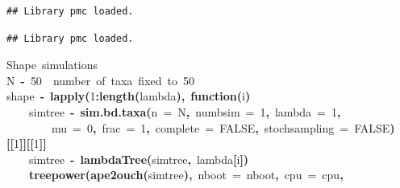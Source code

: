 \documentclass{elsarticle}
\makeatletter
\newcommand{\hlnumber}[1]{\textcolor[rgb]{0,0,0}{#1}}%
\newcommand{\hlfunctioncall}[1]{\textcolor[rgb]{.5,0,.33}{\textbf{#1}}}%
\newcommand{\hlkeyword}[1]{\textbf{#1}}%
\newcommand{\hlargument}[1]{\textcolor[rgb]{.69,.25,.02}{#1}}%
\newcommand{\hlcomment}[1]{\textcolor[rgb]{.18,.6,.34}{#1}}%
\newcommand{\hlformalargs}[1]{\hlargument{#1}}%
\newcommand{\hlassignement}[1]{\textbf{#1}}%
\newcommand{\hlsymbol}[1]{#1}%
\newcommand{\hlstd}[1]{\textcolor[rgb]{0,0,0}{#1}}%
\newenvironment{kframe}{%
 \def\FrameCommand##1{\hskip\@totalleftmargin \hskip-\fboxsep
 \colorbox{shadecolor}{##1}\hskip-\fboxsep
     \hskip-\linewidth \hskip-\@totalleftmargin \hskip\columnwidth}%
 \MakeFramed {\advance\hsize-\width
   \@totalleftmargin\z@ \linewidth\hsize
   \@setminipage}}%
 {\par\unskip\endMakeFramed}
\newenvironment{knitrout}{}{} %
\makeatother
\begin{document}
\begin{knitrout}
{\begin{kframe}
\begin{verbatim}
## Library pmc loaded.
\end{verbatim}
\begin{verbatim}
## Library pmc loaded.
\end{verbatim}
\begin{flushleft}
\ttfamily\noindent
\hlcomment{\usebox{\hlnormalsizeboxhash}\usebox{\hlnormalsizeboxhash}{\ }Shape{\ }simulations}\hspace*{\fill}\\
\hlstd{}\hlsymbol{N}{\ }\hlassignement{\usebox{\hlnormalsizeboxlessthan}-}{\ }\hlnumber{50}{\ }{\ }\hlcomment{\usebox{\hlnormalsizeboxhash}\usebox{\hlnormalsizeboxhash}{\ }number{\ }of{\ }taxa{\ }fixed{\ }to{\ }50}\hspace*{\fill}\\
\hlstd{}\hlsymbol{shape}{\ }\hlassignement{\usebox{\hlnormalsizeboxlessthan}-}{\ }\hlfunctioncall{lapply}\hlkeyword{(}\hlnumber{1}\hlkeyword{:}\hlfunctioncall{length}\hlkeyword{(}\hlsymbol{lambda}\hlkeyword{)}\hlkeyword{,}{\ }\hlkeyword{function}\hlkeyword{(}\hlformalargs{i}\hlkeyword{)}{\ }\hlkeyword{\usebox{\hlnormalsizeboxopenbrace}}\hspace*{\fill}\\
\hlstd{}{\ }{\ }{\ }{\ }\hlsymbol{simtree}{\ }\hlassignement{\usebox{\hlnormalsizeboxlessthan}-}{\ }\hlfunctioncall{sim.bd.taxa}\hlkeyword{(}\hlargument{n}{\ }\hlargument{=}{\ }\hlsymbol{N}\hlkeyword{,}{\ }\hlargument{numbsim}{\ }\hlargument{=}{\ }\hlnumber{1}\hlkeyword{,}{\ }\hlargument{lambda}{\ }\hlargument{=}{\ }\hlnumber{1}\hlkeyword{,}\hspace*{\fill}\\
\hlstd{}{\ }{\ }{\ }{\ }{\ }{\ }{\ }{\ }\hlargument{mu}{\ }\hlargument{=}{\ }\hlnumber{0}\hlkeyword{,}{\ }\hlargument{frac}{\ }\hlargument{=}{\ }\hlnumber{1}\hlkeyword{,}{\ }\hlargument{complete}{\ }\hlargument{=}{\ }\hlnumber{FALSE}\hlkeyword{,}{\ }\hlargument{stochsampling}{\ }\hlargument{=}{\ }\hlnumber{FALSE}\hlkeyword{)}\hlkeyword{[[}\hlnumber{1}\hlkeyword{]}\hlkeyword{]}\hlkeyword{[[}\hlnumber{1}\hlkeyword{]}\hlkeyword{]}\hspace*{\fill}\\
\hlstd{}{\ }{\ }{\ }{\ }\hlsymbol{simtree}{\ }\hlassignement{\usebox{\hlnormalsizeboxlessthan}-}{\ }\hlfunctioncall{lambdaTree}\hlkeyword{(}\hlsymbol{simtree}\hlkeyword{,}{\ }\hlsymbol{lambda}\hlkeyword{[}\hlsymbol{i}\hlkeyword{]}\hlkeyword{)}\hspace*{\fill}\\
\hlstd{}{\ }{\ }{\ }{\ }\hlfunctioncall{treepower}\hlkeyword{(}\hlfunctioncall{ape2ouch}\hlkeyword{(}\hlsymbol{simtree}\hlkeyword{)}\hlkeyword{,}{\ }\hlargument{nboot}{\ }\hlargument{=}{\ }\hlsymbol{nboot}\hlkeyword{,}{\ }\hlargument{cpu}{\ }\hlargument{=}{\ }\hlsymbol{cpu}\hlkeyword{,}\hspace*{\fill}\\

\end{flushleft}
\end{kframe}}
\end{knitrout}
\end{document}
